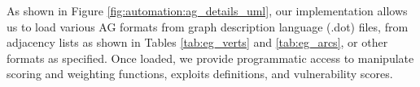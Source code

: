 As shown in Figure \ref{fig:automation:ag_details_uml}, our implementation allows us to load various AG formats from graph description language (.dot) files, from adjacency lists as shown in Tables \ref{tab:eg_verts} and \ref{tab:eg_arcs}, or other formats as specified. Once loaded, we provide programmatic access to manipulate scoring and weighting functions, exploits definitions, and vulnerability scores. 





